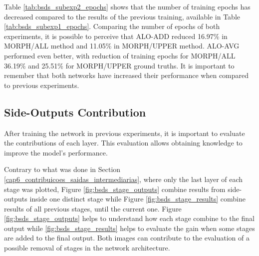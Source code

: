Table \ref{tab:bsds_subexp2_epochs}  shows that the number of training epochs has decreased compared to the results of the previous training, available in Table \ref{tab:bsds_subexp1_epochs}.
Comparing the number of epochs of both experiments, it is possible to perceive that ALO-ADD reduced 16.97\% in MORPH/ALL method and 11.05\% in MORPH/UPPER method.
ALO-AVG performed even better, with reduction of training epochs for MORPH/ALL 36.19\% and 25.51\% for MORPH/UPPER ground truths.
It is important to remember that both networks have increased their performance when compared to previous experiments.

\subsection{Side-Outputs Contribution}
\label{ssec:bsds_sideout}

After training the network in previous experiments, it is important to evaluate the contributions of each layer.
This evaluation allows obtaining knowledge to improve the model's performance.

Contrary to what was done in Section \ref{cap6_contribuicoes_saidas_intermediarias}, where only the last layer of each stage was plotted,
Figure \ref{fig:bsds_stage_outputs} combine results from side-outputs inside one distinct stage while Figure \ref{fig:bsds_stage_results} combine results of all previous stages, until the current one.
Figure \ref{fig:bsds_stage_outputs} helps to understand how each stage combine to the final output while \ref{fig:bsds_stage_results} helps to evaluate the gain when some stages are added to the final output.
Both images can contribute to the evaluation of a possible removal of stages in the network architecture.


% 

